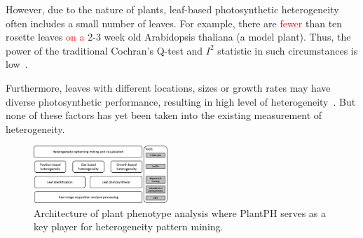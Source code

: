 \documentclass{bioinfo}
\begin{document}
However, due to the nature of plants, leaf-based photosynthetic heterogeneity often includes a small number of leaves. For example, there are \textcolor{red}{fewer} %
than ten rosette leaves %
\textcolor{red}{on a} 2-3 week old Arabidopsis thaliana (a model plant). Thus, the power of the traditional Cochran's Q-test and $I^2$ statistic in such circumstances is low~\citep{higgins2003measuring, gavaghan2000evaluation,huedo2006assessing,ioannidis2007uncertainty}.

Furthermore, leaves with different locations, sizes or growth rates may have diverse photosynthetic performance, resulting in high level of heterogeneity~\citep{van1991insertional,chen2008effect}. But none of these factors has yet been taken into the existing measurement of heterogeneity.





\begin{figure}
  \centering
  \includegraphics[width=0.45\textwidth]{architecture.png}\vspace{-0.1in}
  \caption{Architecture of plant phenotype analysis where PlantPH serves as a key player for heterogeneity pattern mining.}\label{fig:architecture}\vspace{-0.2in}
\end{figure}
\end{document}
